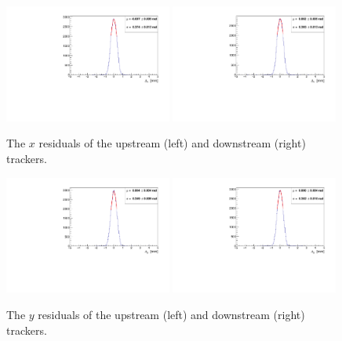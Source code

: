  \begin{figure}[p]
    \begin{center}
      \includegraphics[width=0.49\textwidth, angle=0]{08-Performance/upstream_x_residual.pdf}
      \includegraphics[width=0.49\textwidth, angle=0]{08-Performance/downstream_x_residual.pdf}
      \caption{\label{fig:XResidKalman} The $x$ residuals of the upstream (left) and downstream (right) trackers.}
    \end{center}
  \end{figure}
  
    \begin{figure}[p]
    \begin{center}
      \includegraphics[width=0.49\textwidth, angle=0]{08-Performance/upstream_y_residual.pdf}
      \includegraphics[width=0.49\textwidth, angle=0]{08-Performance/downstream_y_residual.pdf}
      \caption{\label{fig:YResidKalman} The $y$ residuals of the upstream (left) and downstream (right) trackers.}
    \end{center}
  \end{figure} 
  
